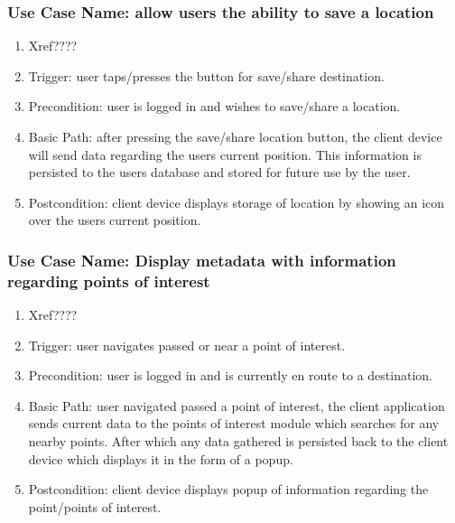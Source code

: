 \documentclass[11pt,a4paper]{article}
\begin{document}
			\subsubsection{Use Case Name: allow users the ability to save a location}
				\begin{enumerate}
				\renewcommand{\labelenumi}{{\textbf{\arabic{enumi}.}}}
				\item Xref????  %
				\item Trigger: user taps/presses  the button for save/share destination.
				\item Precondition: user is logged in and wishes to save/share a location.
				\item Basic Path: after pressing the save/share location button, the client device will send data regarding the users current position. This information is persisted to the users database and stored for future use by the user.
				\item Postcondition: client device displays storage of location by showing an icon over the users current position.
				\end{enumerate}
				
			\subsubsection{Use Case Name: Display metadata with information regarding points of interest}
				\begin{enumerate}
				\renewcommand{\labelenumi}{{\textbf{\arabic{enumi}.}}}
				\item Xref????  %
				\item Trigger: user navigates passed or near a point of interest.
				\item Precondition: user is logged in and is currently en route to a destination.
				\item Basic Path: user navigated passed a point of interest, the client application sends current data to the points of interest module which searches for any nearby points. After which any data gathered is persisted back to the client device which displays it in the form of a popup.
				\item Postcondition: client device displays popup of information regarding the point/points of interest.
				\end{enumerate}
				
\end{document}
